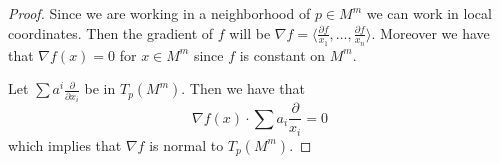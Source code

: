 \documentclass[10pt]{article}
\newcommand{\sk}{\vskip 10mm}
\theoremstyle{plain}
\theoremstyle{remark}
\begin{document}
\begin{proof}
  Since we are working in a neighborhood of $p\in M^m$ we can work in
  local coordinates. Then the gradient of $f$ will be
  $\nabla f= \langle\frac{\partial f}{x_1},\ldots,\frac{\partial f}{x_n}\rangle$. Moreover
  we have that $\nabla f(x)=0$ for $x\in M^m$ since $f$ is constant on $M^m$.

  Let $\sum a^i\frac{\partial}{\partial x_i}$ be in $T_p(M^m)$. Then we have that
  \[
    \nabla f(x)\cdot\sum a_i\frac{\partial}{x_i}=0
  \]
  which implies that $\nabla f$ is normal to $T_p(M^m)$.
\end{proof}

\sk

\end{document}
